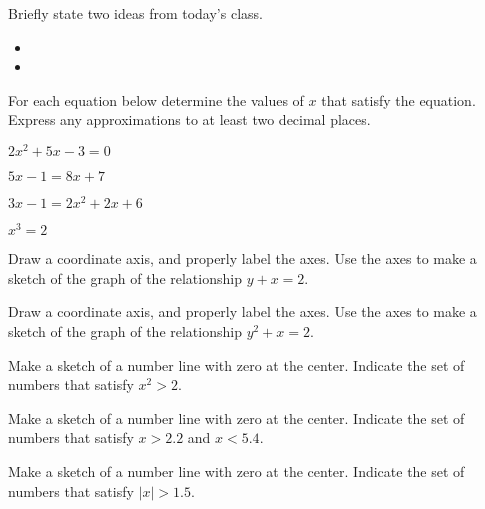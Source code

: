 \postClass

\begin{problem}
\item Briefly state two ideas from today's class.
  \begin{itemize}
  \item
  \item
  \end{itemize}
\item For each equation below determine the values of $x$ that satisfy
  the equation. Express any approximations to at least two decimal
  places.
  \begin{subproblem}
    \item $2x^2 + 5x - 3 = 0$
    \item $5x-1=8x+7$
    \item $3x - 1 = 2x^2 + 2x + 6$
    \item $x^3 = 2$
  \end{subproblem}
\item Draw a coordinate axis, and properly label the axes. Use the
  axes to make a sketch of the graph of the relationship $y+x=2$.
\item Draw a coordinate axis, and properly label the axes. Use the
  axes to make a sketch of the graph of the relationship $y^2+x=2$.
\item Make a sketch of a number line with zero at the center.
  Indicate the set of numbers that satisfy $x^2>2$.
\item Make a sketch of a number line with zero at the center.
  Indicate the set of numbers that satisfy $x>2.2$ and $x<5.4$.
\item Make a sketch of a number line with zero at the center.
  Indicate the set of numbers that satisfy $|x|>1.5$.
\end{problem}
